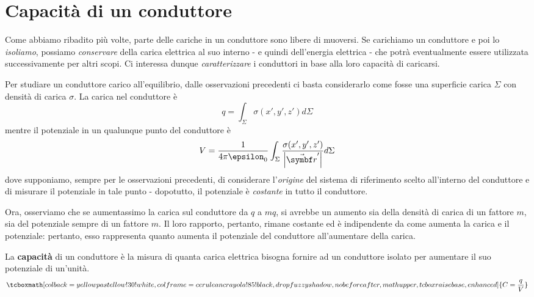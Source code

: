 \section{Capacità di un conduttore}
Come abbiamo ribadito più volte, parte delle cariche in un conduttore sono libere di muoversi. Se carichiamo un conduttore e poi lo \textit{isoliamo}, possiamo \textit{conservare} della carica elettrica al suo interno - e quindi dell'energia elettrica - che potrà eventualmente essere utilizzata successivamente per altri scopi. %
Ci interessa dunque \textit{caratterizzare} i conduttori in base alla loro capacità di caricarsi.
\begin{observe}
	Per studiare un conduttore carico all'equilibrio, dalle osservazioni precedenti ci basta considerarlo come fosse una superficie carica $\Sigma$ con densità di carica $\sigma$. La carica nel conduttore è
	\begin{equation*}
		q=\int_{\Sigma}\sigma\left(x',y',z'\right)d\Sigma
	\end{equation*}
	mentre il potenziale in un qualunque punto del conduttore è
	\begin{equation*}
		V=\frac{1}{4\pi\epsilon_0}\int_{\Sigma}\frac{\sigma(x',y',z')}{\abs{\vba{r}'}}d\Sigma
	\end{equation*}
	dove supponiamo, sempre per le osservazioni precedenti, di considerare l'\textit{origine} del sistema di riferimento scelto all'interno del conduttore e di misurare il potenziale in tale punto - dopotutto, il potenziale è \textit{costante} in tutto il conduttore.
\end{observe}%
Ora, osserviamo che se aumentassimo la carica sul conduttore da $q$ a $mq$, si avrebbe un aumento sia della densità di carica di un fattore $m$, sia del potenziale sempre di un fattore $m$. Il loro rapporto, pertanto, rimane costante ed è indipendente da come aumenta la carica e il potenziale: pertanto, esso rappresenta quanto aumenta il potenziale del conduttore all'aumentare della carica. 
\begin{define}
	La \textbf{capacità} di un conduttore è la misura di quanta carica elettrica bisogna fornire ad un conduttore isolato per aumentare il suo potenziale di un'unità.
	\begin{equation}
		\tcboxmath[colback=yellowpastellow!30!white,colframe=ceruleancrayola!85!black,drop fuzzy shadow, nobeforeafter, math upper, tcbox raise base, enhanced]{C=\frac{q}{V}}
	\end{equation}
\end{define}
